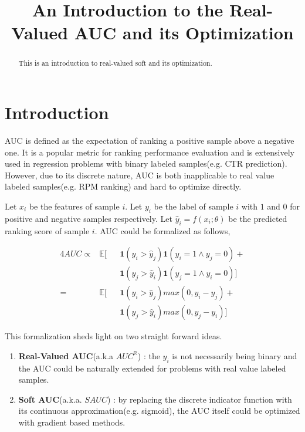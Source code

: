 \documentclass[sigconf]{acmart}
\newcommand{\ty}[1]{\hat{y}_{#1}}
\newcommand{\tyi}{\ty{i}}
\newcommand{\sF}[1]{f(x_{#1}; \theta)}
\newcommand{\sFi}{\sF{i}}
\newcommand{\RealAUC}{AUC^{\mathbb{R}}}
\newcommand{\SoftAUC}{SAUC}
\newcommand{\SwapIndic}[5]{#1 ( #2{#3} #5 #2{#4} )}
\newcommand{\SwapIndicHardY}[2]{\SwapIndic{\textbf{1}}{\ty}{#1}{#2}{>}}
\newcommand{\SwapGainHard}[2]{\textbf{1}(y_{#1}=1 \wedge y_{#2}=0)}
\newcommand{\SwapGainAsym}[2]{max(0, y_{#1} - y_{#2})}
\begin{document}
\title{An Introduction to the Real-Valued AUC and its Optimization}

\begin{abstract}
This is an introduction to real-valued soft and its optimization.
\end{abstract}


\maketitle

\section{Introduction}

AUC is defined as the expectation of ranking a positive sample above a negative one.
It is a popular metric for ranking performance evaluation and is extensively used in regression problems with binary labeled samples(e.g. CTR prediction).
However, due to its discrete nature, AUC is both inapplicable to real value labeled samples(e.g. RPM ranking) and hard to optimize directly.

Let $x_i$ be the features of sample $i$.
Let $y_i$ be the label of sample $i$ with $1$ and $0$ for positive and negative samples respectively.
Let $\tyi = \sFi$ be the predicted ranking score of sample $i$.
AUC could be formalized as follows,

\begin{alignat*}{4}
  AUC \propto & \mathbb{E} [ && \SwapIndicHardY{i}{j} \SwapGainHard{i}{j}  + \\
              &              && \SwapIndicHardY{j}{i} \SwapGainHard{j}{i} ] \\
      =       & \mathbb{E} [ && \SwapIndicHardY{i}{j} \SwapGainAsym{i}{j}  + \\
              &              && \SwapIndicHardY{j}{i} \SwapGainAsym{j}{i} ]
\end{alignat*}

This formalization sheds light on two straight forward ideas.

\begin{enumerate}
\item \textbf{Real-Valued AUC}(a.k.a $\RealAUC$) :
  the $y_i$ is not necessarily being binary and
  the AUC could be naturally extended for problems with real value labeled samples.
\item \textbf{Soft AUC}(a.k.a. $\SoftAUC$) :
  by replacing the discrete indicator function with its continuous approximation(e.g. sigmoid),
  the AUC itself could be optimized with gradient based methods.
\end{enumerate}
\end{document}
